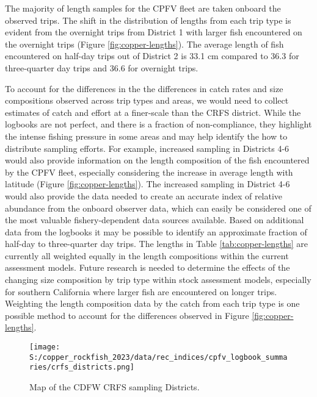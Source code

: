 \documentclass[11pt,
  letterpaper,
]{article}
\begin{document}
The majority of length samples for the CPFV fleet are taken onboard the observed trips. The shift in the distribution of lengths from each trip type is evident from the overnight trips from District 1 with larger fish encountered on the overnight trips (Figure \ref{fig:copper-lengths}). The average length of fish encountered on half-day trips out of District 2 is 33.1 cm compared to 36.3 for three-quarter day trips and 36.6 for overnight trips.

To account for the differences in the the differences in catch rates and size compositions observed across trip types and areas, we would need to collect estimates of catch and effort at a finer-scale than the CRFS district. While the logbooks are not perfect, and there is a fraction of non-compliance, they highlight the intense fishing pressure in some areas and may help identify the how to distribute sampling efforts. For example, increased sampling in Districts 4-6 would also provide information on the length composition of the fish encountered by the CPFV fleet, especially considering the increase in average length with latitude (Figure \ref{fig:copper-lengths}). The increased sampling in District 4-6 would also provide the data needed to create an accurate index of relative abundance from the onboard observer data, which can easily be considered one of the most valuable fishery-dependent data sources available. Based on additional data from the logbooks it may be possible to identify an approximate fraction of half-day to three-quarter day trips. The lengths in Table \ref{tab:copper-lengths} are currently all weighted equally in the length compositions within the current assessment models. Future research is needed to determine the effects of the changing size composition by trip type within stock assessment models, especially for southern California where larger fish are encountered on longer trips. Weighting the length composition data by the catch from each trip type is one possible method to account for the differences observed in Figure \ref{fig:copper-lengths}.

\newpage

\begin{figure}
{\centering
\texttt{[image: S:/copper\_rockfish\_2023/data/rec\_indices/cpfv\_logbook\_summaries/crfs\_districts.png]}
}
\caption{Map of the CDFW CRFS sampling Districts.\label{fig:crfs-districts}}
\end{figure}
\end{document}
